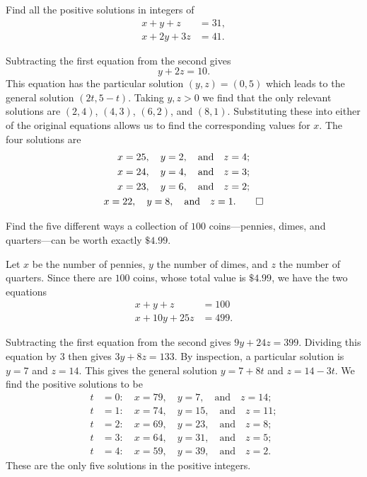  Find all the positive solutions in integers of
\begin{align*}
  x + y + z &= 31, \\
  x + 2y + 3z &= 41.
\end{align*}
\begin{solution}
  Subtracting the first equation from the second gives
  \begin{equation*}
    y + 2z = 10.
  \end{equation*}
  This equation has the particular solution $(y,z) = (0,5)$ which
  leads to the general solution $(2t,5-t)$. Taking $y,z>0$ we find
  that the only relevant solutions are $(2,4)$, $(4,3)$, $(6,2)$, and
  $(8,1)$. Substituting these into either of the original equations
  allows us to find the corresponding values for $x$. The four
  solutions are
  \begin{gather*}
    x = 25,\quad y = 2,\quad\text{and}\quad z = 4; \\
    x = 24,\quad y = 4,\quad\text{and}\quad z = 3; \\
    x = 23,\quad y = 6,\quad\text{and}\quad z = 2; \\
    x = 22,\quad y = 8,\quad\text{and}\quad z = 1. \qedhere
  \end{gather*}
\end{solution}

 Find the five different ways a collection of $100$
coins---pennies, dimes, and quarters---can be worth exactly $\$4.99$.
\begin{solution}
  Let $x$ be the number of pennies, $y$ the number of dimes, and $z$
  the number of quarters. Since there are $100$ coins, whose total
  value is $\$4.99$, we have the two equations
  \begin{align*}
    x + y + z &= 100 \\
    x + 10y + 25z &= 499.
  \end{align*}

  Subtracting the first equation from the second gives
  $9y + 24z = 399$. Dividing this equation by $3$ then gives
  $3y + 8z = 133$. By inspection, a particular solution is $y = 7$ and
  $z = 14$. This gives the general solution $y = 7 + 8t$ and
  $z = 14 - 3t$. We find the positive solutions to be
  \begin{align*}
    t &= 0\colon\quad x = 79, \quad y = 7, \quad\text{and}\quad z = 14; \\
    t &= 1\colon\quad x = 74, \quad y = 15, \quad\text{and}\quad z = 11; \\
    t &= 2\colon\quad x = 69, \quad y = 23, \quad\text{and}\quad z = 8; \\
    t &= 3\colon\quad x = 64, \quad y = 31, \quad\text{and}\quad z = 5; \\
    t &= 4\colon\quad x = 59, \quad y = 39, \quad\text{and}\quad z = 2.
  \end{align*}
  These are the only five solutions in the positive integers.
\end{solution}

